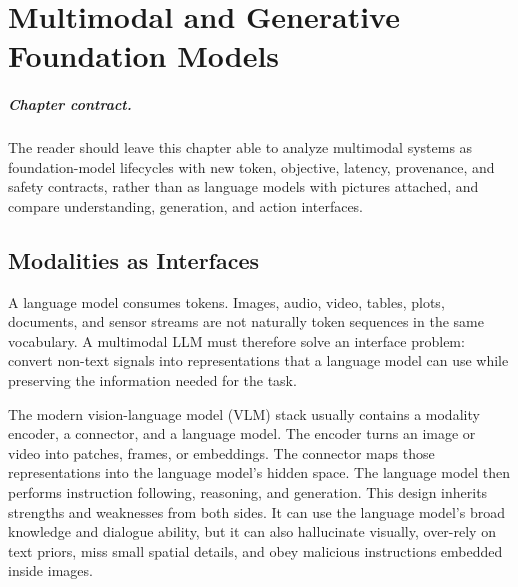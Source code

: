 \chapter{Multimodal and Generative Foundation Models}
\label{ch:multimodal-llms}


\paragraph{Chapter contract.} The reader should leave this chapter able to analyze multimodal systems as foundation-model lifecycles with new token, objective, latency, provenance, and safety contracts, rather than as language models with pictures attached, and compare understanding, generation, and action interfaces.

\section{Modalities as Interfaces}
A language model consumes tokens. Images, audio, video, tables, plots, documents, and sensor streams are not naturally token sequences in the same vocabulary. A multimodal LLM must therefore solve an interface problem: convert non-text signals into representations that a language model can use while preserving the information needed for the task.

The modern vision-language model (VLM) stack usually contains a modality encoder, a connector, and a language model. The encoder turns an image or video into patches, frames, or embeddings. The connector maps those representations into the language model's hidden space. The language model then performs instruction following, reasoning, and generation. This design inherits strengths and weaknesses from both sides. It can use the language model's broad knowledge and dialogue ability, but it can also hallucinate visually, over-rely on text priors, miss small spatial details, and obey malicious instructions embedded inside images.

